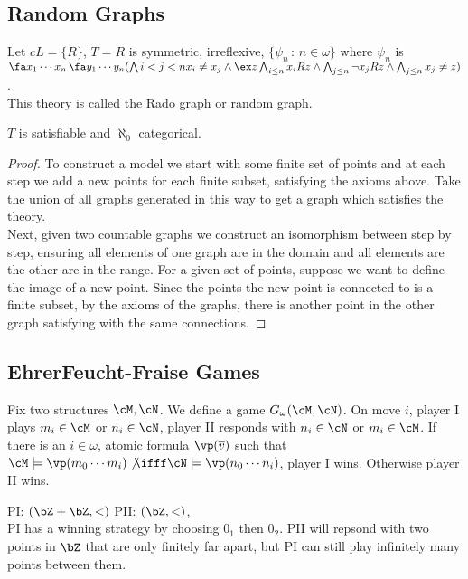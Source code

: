 
\subsection{Random Graphs}

Let $cL = \{R\}$, $T = R$ is symmetric, irreflexive, $\{\psi_n \, : \, n \in \omega\}$ where $\psi_n$ is $\fa x_1 \cdots x_n \, \fa y_1 \cdots y_n(\bigwedge{i< j < n} x_i\neq x_j \wedge \ex z \bigwedge_{i \le n} x_iRz \wedge \bigwedge_{j \le n} \neg x_j R z \wedge \bigwedge_{j \le n} x_j \neq z)$.  \\
This theory is called the Rado graph or random graph. 

\begin{theorem}
    $T$ is satisfiable and $\aleph_0$ categorical. 
\end{theorem}

\begin{proof}
    To construct a model we start with some finite set of points and at each step we add a new points for each finite subset, satisfying the axioms above. Take the union of all graphs generated in this way to get a graph which satisfies the theory. \\
    Next, given two countable graphs we construct an isomorphism between step by step, ensuring all elements of one graph are in the domain and all elements are the other are in the range. For a given set of points, suppose we want to define the image of a new point. Since the points the new point is connected to is a finite subset, by the axioms of the graphs, there is another point in the other graph satisfying with the same connections.    
\end{proof}

\subsection{EhrerFeucht-Fraise Games} 

Fix two structures $\cM, \cN$. We define a game $G_{\omega}(\cM, \cN)$. On move $i$, player I plays $m_i \in \cM$ or $n_i \in \cN$, player II responds with $n_i \in \cN$ or $m_i \in \cM$. If there is an $i \in \omega$, atomic formula $\vp(\overline{v})$ such that $\cM \models \vp(m_0 \cdots m_i) \not\ifff \cN \models \vp(n_0 \cdots n_i)$, player I wins. Otherwise player II wins. 

\begin{example}
    PI: $(\bZ + \bZ, < )$ PII: $(\bZ, <)$, \\
    PI has a winning strategy by choosing $0_1$ then $0_2$. PII will repsond with two points in $\bZ$ that are only finitely far apart, but PI can still play infinitely many points between them.
\end{example}

